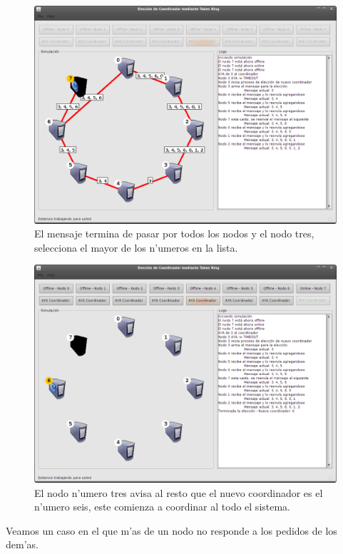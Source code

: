 \begin{figure}
\centering
 \includegraphics[scale=0.4,keepaspectratio=true]{./imagenes/tokenRing/token5.png}
 \caption{El mensaje termina de pasar por todos los nodos y el nodo tres, selecciona el mayor de los n'umeros en la lista.}
\end{figure}

\begin{figure}
\centering
 \includegraphics[scale=0.4,keepaspectratio=true]{./imagenes/tokenRing/token6.png}
 \caption{El nodo n'umero tres avisa al resto que el nuevo coordinador es el n'umero seis, este comienza a coordinar al todo el sistema.}
\end{figure}

Veamos un caso en el que m'as de un nodo no responde a los pedidos de los dem'as.

